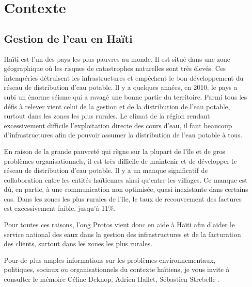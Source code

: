 \documentclass{EPL-master-thesis-covers-FR}
\begin{document}
		
	\chapter{Contexte}


		\section{Gestion de l'eau en Haïti}
			\label{sec:situation}
			
				Haïti est l'un des pays les plus pauvres au monde. Il est situé dans une zone géographique où les risques de catastrophes naturelles sont très élevés. Ces intempéries détruisent les infrastructures et empêchent le bon développement du réseau de distribution d'eau potable. Il y a quelques années, en 2010, le pays a subi un énorme séisme qui a ravagé une bonne partie du territoire. Parmi tous les défis à relever vient celui de la gestion et de la distribution de l'eau potable, surtout dans les zones les plus rurales. Le climat de la région rendant excessivement difficile l'exploitation directe des cours d'eau, il faut beaucoup d'infrastructures afin de pouvoir assumer la distribution de l'eau potable à tous.
				
				En raison de la grande pauvreté qui règne sur la plupart de l'île et de gros problèmes organisationnels, il est très difficile de maintenir et de développer le réseau de distribution d'eau potable. Il y a un manque significatif de collaboration entre les entités haïtiennes ainsi qu'entre les villages. Ce manque est dû, en partie, à une communication non optimisée, quasi inexistante dans certains cas. Dans les zones les plus rurales de l'île, le taux de recouvrement des factures est excessivement faible, jusqu'à 11\%.
				
				Pour toutes ces raisons, l'\gls{ong} Protos vient donc en aide à Haïti afin d'aider le service national des eaux dans la gestion des infrastructures et de la facturation des clients, surtout dans les zones les plus rurales.
				
				Pour de plus amples informations sur les problèmes environnementaux, politiques, sociaux ou organisationnels du contexte haïtiens, je vous invite à consulter le mémoire Céline Deknop, Adrien Hallet, Sébastien Strebelle \cite{ref:haitiwater}.
\end{document}
